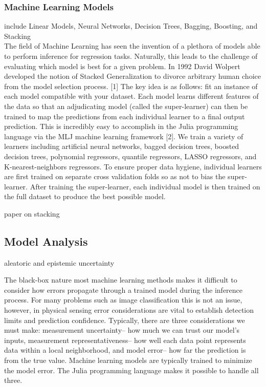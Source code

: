 \subsubsection{Machine Learning Models}
include Linear Models, Neural Networks, Decision Trees, Bagging, Boosting, and Stacking\\

The field of Machine Learning has seen the invention of a plethora of models able to perform inference for regression tasks. Naturally, this leads to the challenge of evaluating which model is best for a given problem. In 1992 David Wolpert developed the notion of Stacked Generalization to divorce arbitrary human choice from the model selection process. [1] The key idea is as follows: fit an instance of each model compatible with your dataset. Each model learns different features of the data so that an adjudicating model (called the super-learner) can then be trained to map the predictions from each individual learner to a final output prediction. This is incredibly easy to accomplish in the Julia programming language via the MLJ machine learning framework [2]. We train a variety of learners including artificial neural networks, bagged decision trees, boosted decision trees, polynomial regressors, quantile regressors, LASSO regressors, and K-nearest-neighbors regressors. To ensure proper data hygiene, individual learners are first trained on separate cross validation folds so as not to bias the super-learner. After training the super-learner, each individual model is then trained on the full dataset to produce the best possible model.


paper on stacking \cite{ModelStacking}

\subsection{Model Analysis}
aleatoric and epistemic uncertainty

The black-box nature most machine learning methods makes it difficult to consider how errors propagate through a trained model during the inference process. For many problems such as image classification this is not an issue, however, in physical sensing error considerations are vital to establish detection limits and prediction confidence. Typically, there are three considerations we must make: measurement uncertainty– how much we can trust our model’s inputs, measurement representativeness– how well each data point represents data within a local neighborhood, and model error– how far the prediction is from the true value. Machine learning models are typically trained to minimize the model error. The Julia programming language makes it possible to handle all three. 


